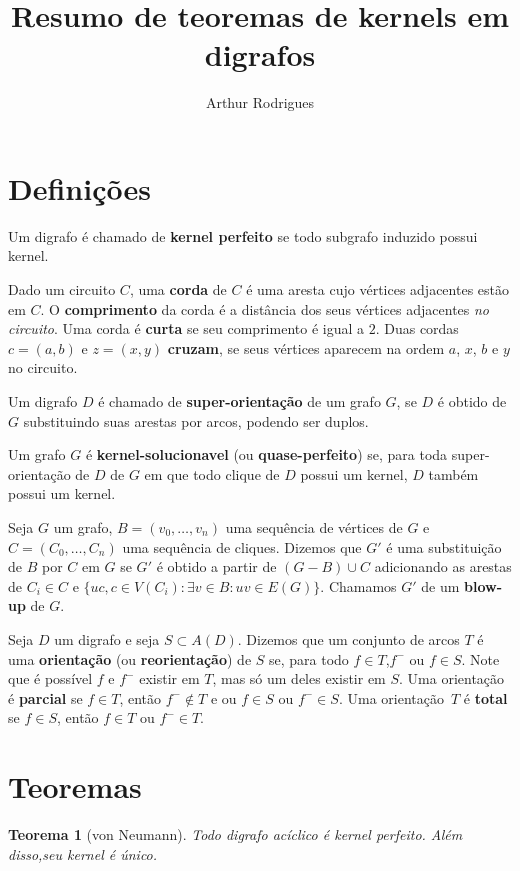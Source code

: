 \documentclass[]{article}
\newcommand{\defi}{\textbf} %
\newtheorem{theorem}{Teorema}
\begin{document}
\title{Resumo de teoremas de kernels em digrafos}
\author{Arthur Rodrigues}
\date{}
\maketitle

\section{Definições}

Um digrafo é chamado de \defi{kernel perfeito} se todo subgrafo induzido possui kernel.

Dado um circuito $C$, uma \defi{corda} de $C$ é uma aresta cujo vértices adjacentes estão em $C$.
O \defi{comprimento} da corda é a distância dos seus vértices adjacentes \textit{no circuito}.
Uma corda é \defi{curta} se seu comprimento é igual a $2$. Duas cordas $c=(a,b)$ e $z=(x,y)$ \defi{cruzam}, se seus vértices aparecem na ordem
$a$, $x$, $b$ e $y$ no circuito.


Um digrafo $D$ é chamado de \defi{super-orientação} de um grafo $G$, se $D$ é obtido de $G$ substituindo suas arestas por arcos, podendo ser duplos.

Um grafo $G$ é \defi{kernel-solucionavel} (ou \defi{quase-perfeito}) se, para toda super-orientação de $D$ de $G$ em que todo clique de $D$ possui um kernel, $D$ também possui um kernel.

Seja $G$ um grafo, 
$B=  (v_0,\dots,v_n)$ uma sequência de vértices de $G$ e $C= (C_0,\dots,C_n)$ uma sequência de cliques.
Dizemos que $G'$ é uma substituição de $B$ por $C$ em $G$ se $G'$ é obtido a partir de $(G - B) \cup C$ adicionando 
as arestas de $C_i \in C$ e $\{uc, c \in V(C_i) : \exists v \in B : uv \in E(G) \}$.
Chamamos $G'$ de um \defi{blow-up} de $G$.

Seja $D$ um digrafo e seja $S \subset A(D)$. Dizemos que um conjunto de arcos $T$ é uma \defi{orientação} (ou \defi{reorientação}) de $S$ se, para todo $f\in T$,$f^-$ ou $f\in S$.
Note que é possível $f$ e $f^-$ existir em $T$, mas só um deles existir em $S$. Uma orientação é \defi{parcial} se $f \in T$, então  $f^- \notin T$ e ou $f \in S$ ou 
$f^- \in S$. Uma orientação~$T$ é \defi{total} se $f \in S$, então $f \in T$ ou $f^- \in T$.

\section{Teoremas}
\begin{theorem}[von Neumann]
Todo digrafo acíclico é kernel perfeito. Além disso,seu kernel é único.
\end{theorem}
\end{document}
